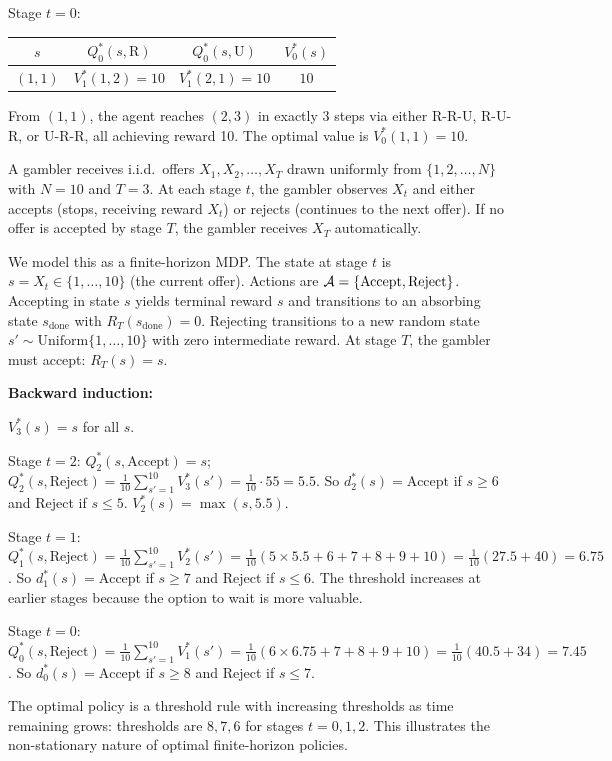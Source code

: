 \documentclass[11pt,a4paper]{article}
\begin{document}
\begin{example}
Stage $t = 0$:
\begin{center}
\begin{tabular}{cccc}
\toprule
$s$ & $Q_0^*(s, \text{R})$ & $Q_0^*(s, \text{U})$ & $V_0^*(s)$ \\
\midrule
$(1,1)$ & $V_1^*(1,2) = 10$ & $V_1^*(2,1) = 10$ & $10$ \\
\bottomrule
\end{tabular}
\end{center}
From $(1,1)$, the agent reaches $(2,3)$ in exactly 3 steps via
either R-R-U, R-U-R, or U-R-R, all achieving reward 10. The
optimal value is $V_0^*(1,1) = 10$.
\end{example}

\begin{example}
\label{ex:optimal-stopping}
A gambler receives i.i.d.\ offers $X_1, X_2, \ldots, X_T$ drawn
uniformly from $\{1, 2, \ldots, N\}$ with $N = 10$ and $T = 3$.
At each stage $t$, the gambler observes $X_t$ and either accepts
(stops, receiving reward $X_t$) or rejects (continues to the next
offer). If no offer is accepted by stage $T$, the gambler receives
$X_T$ automatically.

We model this as a finite-horizon MDP. The state at stage $t$ is
$s = X_t \in \{1, \ldots, 10\}$ (the current offer). Actions are
$\mathcal{A} = \{\text{Accept}, \text{Reject}\}$. Accepting in state
$s$ yields terminal reward $s$ and transitions to an absorbing state
$s_{\mathrm{done}}$ with $R_T(s_{\mathrm{done}}) = 0$. Rejecting
transitions to a new random state $s' \sim
\mathrm{Uniform}\{1,\ldots,10\}$ with zero intermediate reward.
At stage $T$, the gambler must accept: $R_T(s) = s$.

\textbf{Backward induction:}

$V_3^*(s) = s$ for all $s$.

Stage $t = 2$: $Q_2^*(s, \text{Accept}) = s$;
$Q_2^*(s, \text{Reject}) = \frac{1}{10}\sum_{s'=1}^{10} V_3^*(s')
= \frac{1}{10} \cdot 55 = 5.5$.
So $d_2^*(s) = \text{Accept}$ if $s \geq 6$ and Reject if $s \leq 5$.
$V_2^*(s) = \max(s, 5.5)$.

Stage $t = 1$:
$Q_1^*(s, \text{Reject}) = \frac{1}{10}\sum_{s'=1}^{10} V_2^*(s')
= \frac{1}{10}(5 \times 5.5 + 6 + 7 + 8 + 9 + 10)
= \frac{1}{10}(27.5 + 40) = 6.75$.
So $d_1^*(s) = \text{Accept}$ if $s \geq 7$ and Reject if
$s \leq 6$. The threshold increases at earlier stages because the
option to wait is more valuable.

Stage $t = 0$:
$Q_0^*(s, \text{Reject}) = \frac{1}{10}\sum_{s'=1}^{10} V_1^*(s')
= \frac{1}{10}(6 \times 6.75 + 7 + 8 + 9 + 10)
= \frac{1}{10}(40.5 + 34) = 7.45$.
So $d_0^*(s) = \text{Accept}$ if $s \geq 8$ and Reject if
$s \leq 7$.

The optimal policy is a threshold rule with increasing thresholds as
time remaining grows: thresholds are $8, 7, 6$ for stages
$t = 0, 1, 2$. This illustrates the non-stationary nature of
optimal finite-horizon policies.
\end{example}
\end{document}
